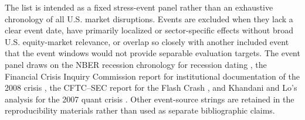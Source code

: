 \documentclass[10pt,twocolumn]{article}
\begin{document}
The list is intended as a fixed stress-event panel rather than an exhaustive chronology of all U.S. market disruptions. Events are excluded when they lack a clear event date, have primarily localized or sector-specific effects without broad U.S. equity-market relevance, or overlap so closely with another included event that the event windows would not provide separable evaluation targets. The event panel draws on the NBER recession chronology for recession dating \cite{nber2023}, the Financial Crisis Inquiry Commission report for institutional documentation of the 2008 crisis \cite{fcic2011}, the CFTC--SEC report for the Flash Crash \cite{cftcsec2010}, and Khandani and Lo's analysis for the 2007 quant crisis \cite{khandani2007}. Other event-source strings are retained in the reproducibility materials rather than used as separate bibliographic claims.
\end{document}
